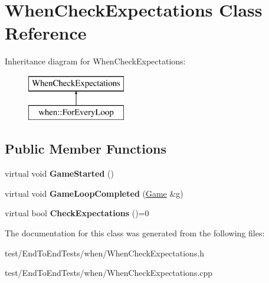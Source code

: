\hypertarget{classWhenCheckExpectations}{}\section{When\+Check\+Expectations Class Reference}
\label{classWhenCheckExpectations}
Inheritance diagram for When\+Check\+Expectations\+:\begin{figure}[H]
\begin{center}
\leavevmode
\includegraphics[height=2.000000cm]{classWhenCheckExpectations}
\end{center}
\end{figure}
\subsection*{Public Member Functions}
\begin{DoxyCompactItemize}
\item 
virtual void {\bfseries Game\+Started} ()\hypertarget{classWhenCheckExpectations_ae5f619803d7a3a9f5580016d8f2b06fa}{}\label{classWhenCheckExpectations_ae5f619803d7a3a9f5580016d8f2b06fa}

\item 
virtual void {\bfseries Game\+Loop\+Completed} (\hyperlink{classGame}{Game} \&g)\hypertarget{classWhenCheckExpectations_a491e70325d6d005e946a59a1bf8f8b50}{}\label{classWhenCheckExpectations_a491e70325d6d005e946a59a1bf8f8b50}

\item 
virtual bool {\bfseries Check\+Expectations} ()=0\hypertarget{classWhenCheckExpectations_afa6df306c951e85b3123af2d18b2934b}{}\label{classWhenCheckExpectations_afa6df306c951e85b3123af2d18b2934b}

\end{DoxyCompactItemize}


The documentation for this class was generated from the following files\+:\begin{DoxyCompactItemize}
\item 
test/\+End\+To\+End\+Tests/when/When\+Check\+Expectations.\+h\item 
test/\+End\+To\+End\+Tests/when/When\+Check\+Expectations.\+cpp\end{DoxyCompactItemize}

